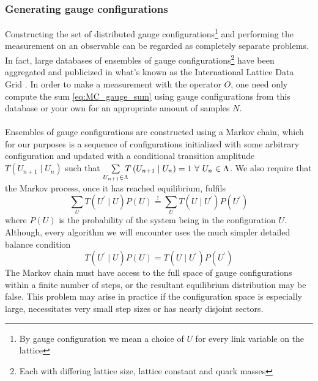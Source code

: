 \documentclass[a4paper,10pt]{article}
\begin{document}
\subsubsection{Generating gauge configurations}
Constructing the set of distributed gauge configurations\footnote{By gauge configuration we mean a choice of $U$ for every link variable on the lattice} and performing the measurement on an observable can be regarded as completely separate problems. In fact, large databases of ensembles of gauge configurations\footnote{Each with differing lattice size, lattice constant and quark masses} have been aggregated and publicized in what's known as the International Lattice Data Grid \cite{Beckett_2011}. In order to make a measurement with the operator $O$, one need only compute the sum \eqref{eq:MC_gauge_sum} using gauge configurations from this database or your own for an appropriate amount of samples $N$.\\\\Ensembles of gauge configurations are constructed using a Markov chain, which for our purposes is a sequence of configurations initialized with some arbitrary configuration and updated with a conditional transition amplitude $T\left( U_{n+1} \mid U_{n} \right)$ such that $\sum\limits_{U_{n+1} \in \Lambda}\mkern-10mu T\left( U_{n+1} \mid U_{n} \right) = 1 \,\,\forall\,\, U_{n} \in \Lambda $. We also require that the Markov process, once it has reached equilibrium, fulfils 
\begin{equation}
\sum_{U} T\left(U^{\prime} \mid U\right) P(U) \stackrel{!}{=} \sum_{U} T\left(U \mid U^{\prime}\right) P\left(U^{\prime}\right)
\end{equation}
where $P(U)$ is the probability of the system being in the configuration $U$. Although, every algorithm we will encounter uses the much simpler detailed balance condition
\begin{equation}
T\left(U^{\prime} \mid U\right) P(U) =  T\left(U \mid U^{\prime}\right) P\left(U^{\prime}\right)
\end{equation}
The Markov chain must have access to the full space of gauge configurations within a finite number of steps, or the resultant equilibrium distribution may be false. This problem may arise in practice if the configuration space is especially large, necessitates very small step sizes or has nearly disjoint sectors.
\end{document}
